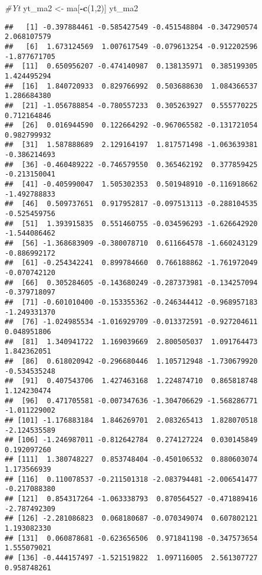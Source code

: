 \documentclass[
]{article}
\newenvironment{Shaded}{\begin{snugshade}}{\end{snugshade}}
\newcommand{\CommentTok}[1]{\textcolor[rgb]{0.56,0.35,0.01}{\textit{#1}}}
\newcommand{\DecValTok}[1]{\textcolor[rgb]{0.00,0.00,0.81}{#1}}
\newcommand{\FunctionTok}[1]{\textcolor[rgb]{0.13,0.29,0.53}{\textbf{#1}}}
\newcommand{\NormalTok}[1]{#1}
\newcommand{\OtherTok}[1]{\textcolor[rgb]{0.56,0.35,0.01}{#1}}
\newcommand{\SpecialCharTok}[1]{\textcolor[rgb]{0.81,0.36,0.00}{\textbf{#1}}}
\begin{document}
\begin{Shaded}
\begin{Highlighting}[]
\CommentTok{\#Yt}
\NormalTok{yt\_ma2 }\OtherTok{\textless{}{-}}\NormalTok{ ma[}\SpecialCharTok{{-}}\FunctionTok{c}\NormalTok{(}\DecValTok{1}\NormalTok{,}\DecValTok{2}\NormalTok{)]}
\NormalTok{yt\_ma2}
\end{Highlighting}
\end{Shaded}

\begin{verbatim}
##   [1] -0.397884461 -0.585427549 -0.451548804 -0.347290574  2.068107579
##   [6]  1.673124569  1.007617549 -0.079613254 -0.912202596 -1.877671705
##  [11]  0.650956207 -0.474140987  0.138135971  0.385199305  1.424495294
##  [16]  1.840720933  0.829766992  0.503688630  1.084366537  1.286684380
##  [21] -1.056788854 -0.780557233  0.305263927  0.555770225  0.712164846
##  [26]  0.016944590  0.122664292 -0.967065582 -0.131721054  0.982799932
##  [31]  1.587888689  2.129164197  1.817571498 -1.063639381 -0.386214693
##  [36] -0.460489222 -0.746579550  0.365462192  0.377859425 -0.213150041
##  [41] -0.405990047  1.505302353  0.501948910 -0.116918662 -1.492788833
##  [46]  0.509737651  0.917952817 -0.097513113 -0.288104535 -0.525459756
##  [51]  1.393915835  0.551460755 -0.034596293 -1.626642920 -1.544086462
##  [56] -1.368683909 -0.380078710  0.611664578 -1.660243129 -0.886992172
##  [61] -0.254342241  0.899784660  0.766188862 -1.761972049 -0.070742120
##  [66]  0.305284605 -0.143680249 -0.287373981 -0.134257094 -0.379718097
##  [71] -0.601010400 -0.153355362 -0.246344412 -0.968957183 -1.249331370
##  [76] -1.024985534 -1.016929709 -0.013372591 -0.927204611  0.048951806
##  [81]  1.340941722  1.169039669  2.800505037  1.091764473  1.842362051
##  [86]  0.618020942 -0.296680446  1.105712948 -1.730679920 -0.534535248
##  [91]  0.407543706  1.427463168  1.224874710  0.865818748  1.124230474
##  [96]  0.471705581 -0.007347636 -1.304706629 -1.568286771 -1.011229002
## [101] -1.176883184  1.846269701  2.083265413  1.828070518 -2.124535589
## [106] -1.246987011 -0.812642784  0.274127224  0.030145849  0.192097260
## [111]  1.380748227  0.853748404 -0.450106532  0.880603074  1.173566939
## [116]  0.110078537 -0.211501318 -2.083794481 -2.006541477 -0.217088380
## [121]  0.854317264 -1.063338793  0.870564527 -0.471889416 -2.787492309
## [126] -2.281086823  0.068180687 -0.070349074  0.607802121  1.193082330
## [131]  0.060878681 -0.623656506  0.971841198 -0.347573654  1.555079021
## [136] -0.444157497 -1.521519822  1.097116005  2.561307727  0.958748261

\end{verbatim}
\end{document}

